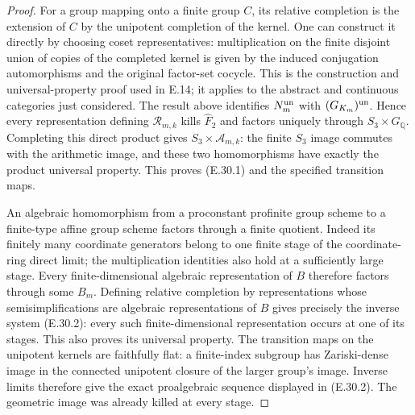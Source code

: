 \begin{proof}
For a group mapping onto a finite group $C$, its relative
completion is the extension of $C$ by the unipotent completion
of the kernel. One can construct it directly by choosing coset
representatives: multiplication on the finite disjoint union of
copies of the completed kernel is given by the induced conjugation
automorphisms and the original factor-set cocycle. This is the
construction and universal-property proof used in E.14; it applies
to the abstract and continuous categories just considered.
The result above identifies $N_m^{\rm un}$ with
$(G_{K_m})^{\rm un}$. Hence every representation defining
$\mathcal R_{m,k}$ kills $\widehat F_2$ and factors uniquely through
$S_3\times G_{\mathbb Q}$. Completing this direct product gives
$S_3\times\mathcal A_{m,k}$: the finite $S_3$ image commutes with
the arithmetic image, and these two homomorphisms have exactly
the product universal property. This proves (E.30.1) and the
specified transition maps.

An algebraic homomorphism from a proconstant profinite group
scheme to a finite-type affine group scheme factors through a
finite quotient. Indeed its finitely many coordinate generators
belong to one finite stage of the coordinate-ring direct limit;
the multiplication identities also hold at a sufficiently large
stage. Every finite-dimensional algebraic representation of $B$
therefore factors through some $B_m$. Defining relative completion
by representations whose semisimplifications are algebraic
representations of $B$ gives precisely the inverse system
(E.30.2): every such finite-dimensional representation occurs at
one of its stages. This also proves its universal property.
The transition maps on the unipotent kernels are faithfully flat:
a finite-index subgroup has Zariski-dense image in the connected
unipotent closure of the larger group's image. Inverse limits
therefore give the exact proalgebraic sequence displayed in
(E.30.2). The geometric image was already killed at every stage.


\end{proof}
